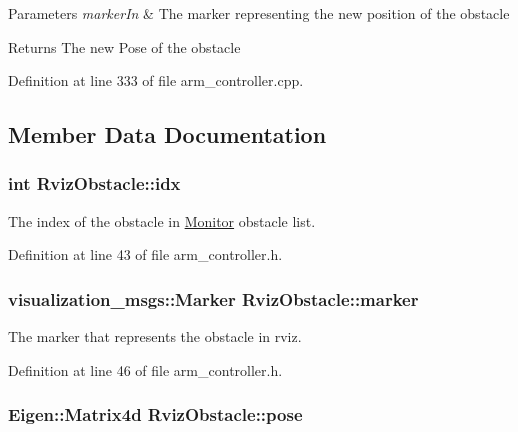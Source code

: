 \begin{DoxyParams}{Parameters}
{\em marker\+In} & The marker representing the new position of the obstacle \\
\hline
\end{DoxyParams}
\begin{DoxyReturn}{Returns}
The new Pose of the obstacle 
\end{DoxyReturn}


Definition at line 333 of file arm\+\_\+controller.\+cpp.



\subsection{Member Data Documentation}
\subsubsection[{\texorpdfstring{idx}{idx}}]{\setlength{\rightskip}{0pt plus 5cm}int Rviz\+Obstacle\+::idx}\hypertarget{class_rviz_obstacle_aac6f99fde043e8d9c0e9d0bab32fd375}{}\label{class_rviz_obstacle_aac6f99fde043e8d9c0e9d0bab32fd375}


The index of the obstacle in \hyperlink{class_monitor}{Monitor} obstacle list. 



Definition at line 43 of file arm\+\_\+controller.\+h.

\subsubsection[{\texorpdfstring{marker}{marker}}]{\setlength{\rightskip}{0pt plus 5cm}visualization\+\_\+msgs\+::\+Marker Rviz\+Obstacle\+::marker}\hypertarget{class_rviz_obstacle_a9edb18553236c56fb49e9d181e0ed052}{}\label{class_rviz_obstacle_a9edb18553236c56fb49e9d181e0ed052}


The marker that represents the obstacle in rviz. 



Definition at line 46 of file arm\+\_\+controller.\+h.

\subsubsection[{\texorpdfstring{pose}{pose}}]{\setlength{\rightskip}{0pt plus 5cm}Eigen\+::\+Matrix4d Rviz\+Obstacle\+::pose}\hypertarget{class_rviz_obstacle_aa48c4d1a26938cb932aac1439373b60b}{}\label{class_rviz_obstacle_aa48c4d1a26938cb932aac1439373b60b}


